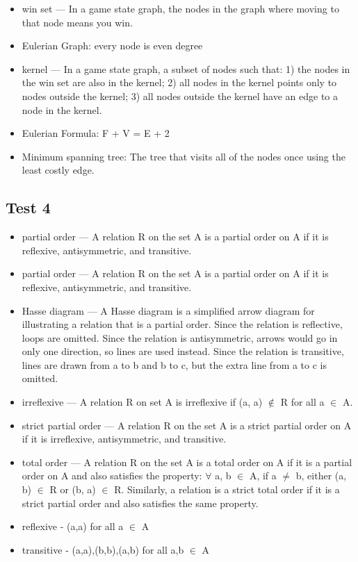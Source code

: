\documentclass[8pt]{article}
\begin{document}
\begin{paracol}{3}
\begin{itemize}[noitemsep]
            \switchcolumn
            \item  win set — In a game state graph, the nodes in the graph where moving to that node means you win.
            \item   Eulerian Graph: every node is even degree
            \item  kernel — In a game state graph, a subset of nodes such that: 1) the nodes in the win set are also in the kernel; 2) all nodes in the kernel points only to nodes outside the kernel; 3) all nodes outside the kernel have an edge to a node in the kernel.
            \item  Eulerian Formula: F + V = E + 2
            \item  Minimum spanning tree: The tree that visits all of the nodes once using the least costly edge.
        \end{itemize}
        \subsection*{Test 4}
        \begin{itemize}[noitemsep]
            \item partial order — A relation R on the set A is a partial order on A if it is reflexive, antisymmetric, and transitive.
            \item  partial order — A relation R on the set A is a partial order on A if it is reflexive, antisymmetric, and transitive.
            \item  Hasse diagram — A Hasse diagram is a simplified arrow diagram for illustrating a relation that is a partial order. Since the relation is reflective, loops are omitted. Since the relation is antisymmetric, arrows would go in only one direction, so lines are used instead. Since the relation is transitive, lines are drawn from a to b and b to c, but the extra line from a to c is omitted.
            \item  irreflexive — A relation R on set A is irreflexive if (a, a) $\notin$ R for all a $\in$ A.
            \item  strict partial order — A relation R on the set A is a strict partial order on A if it is irreflexive, antisymmetric, and transitive.
            \item  total order — A relation R on the set A is a total order on A if it is a partial order on A and also satisfies the property: $\forall$ a, b $\in$ A, if a $\neq$ b, either (a, b) $\in$ R or (b, a) $\in$ R. Similarly, a relation is a strict total order if it is a strict partial order and also satisfies the same property.
            \item  reflexive - (a,a) for all a $\in$ A
            \item  transitive - (a,a),(b,b),(a,b) for all a,b $\in$ A
        \end{itemize}
        \switchcolumn

\end{paracol}
\end{document}
